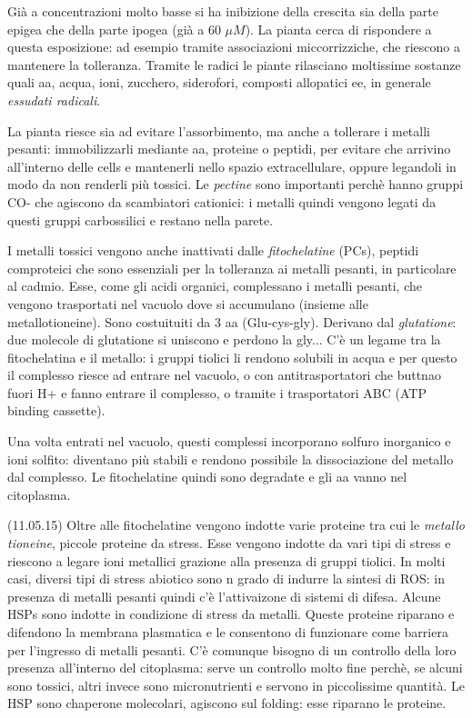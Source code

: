 \documentclass[a4paper,12pt]{book}
\begin{document}
Già a concentrazioni molto basse si ha inibizione della crescita sia della parte epigea che della parte ipogea (già a 60 $\mu M$). La pianta cerca di rispondere a questa esposizione: ad esempio tramite associazioni miccorrizziche, che riescono a mantenere la tolleranza. Tramite le radici le piante rilasciano moltissime sostanze quali aa, acqua, ioni, zucchero, siderofori, composti allopatici ee, in generale \emph{essudati radicali}.

La pianta riesce sia ad evitare l'assorbimento, ma anche a tollerare i metalli pesanti: immobilizzarli mediante aa, proteine o peptidi, per evitare che arrivino all'interno delle cells e mantenerli nello spazio extracellulare, oppure legandoli in modo da non renderli più tossici. Le \emph{pectine} sono importanti perchè hanno gruppi CO- che agiscono da scambiatori cationici: i metalli quindi vengono legati da questi gruppi carbossilici e restano nella parete.
 
I metalli tossici vengono anche inattivati dalle \emph{fitochelatine} (PCs), peptidi comproteici che sono essenziali per la tolleranza ai metalli pesanti, in particolare al cadmio. Esse, come gli acidi organici, complessano i metalli pesanti, che vengono trasportati nel vacuolo dove si accumulano (insieme alle metallotioneine).  Sono costuituiti da 3 aa (Glu-cys-gly). Derivano dal \emph{glutatione}: due molecole di glutatione si uniscono e perdono la gly...
 C'è un legame tra la fitochelatina e il metallo: i gruppi tiolici li rendono solubili in acqua e per questo il complesso riesce ad entrare nel vacuolo, o con antitrasportatori che buttnao fuori H+ e fanno entrare il complesso, o tramite i trasportatori ABC (ATP binding cassette).
 
Una volta entrati nel vacuolo, questi complessi incorporano solfuro inorganico e ioni solfito: diventano più stabili e rendono possibile la dissociazione del metallo dal complesso. Le fitochelatine quindi sono degradate e gli aa vanno nel citoplasma.
  
(11.05.15)
Oltre alle fitochelatine vengono indotte varie proteine tra cui le \emph{metallo tioneine}, piccole proteine da stress. Esse vengono indotte da vari tipi di stress e riescono a legare ioni metallici grazione alla presenza di gruppi tiolici.
In molti casi, diversi tipi di stress abiotico sono n grado di indurre la sintesi di ROS: in presenza di metalli pesanti quindi c'è l'attivaizone di sistemi di difesa. Alcune HSPs sono indotte in condizione di stress da metalli. Queste proteine riparano e difendono la membrana plasmatica e le consentono di funzionare come barriera per l'ingresso di metalli pesanti. C'è comunque bisogno di un controllo della loro presenza all'interno del citoplasma: serve un controllo molto fine perchè, se alcuni sono tossici, altri invece sono micronutrienti e servono in piccolissime quantità. Le HSP sono chaperone molecolari, agiscono sul folding: esse riparano le proteine.
\end{document}
